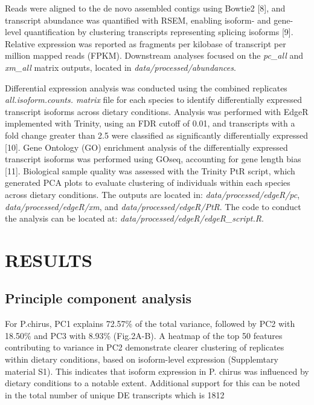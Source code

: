 \documentclass[12pt,]{article}
\begin{document}
Reads were aligned to the de novo assembled contigs using Bowtie2
{[}8{]}, and transcript abundance was quantified with RSEM, enabling
isoform- and gene-level quantification by clustering transcripts
representing splicing isoforms {[}9{]}. Relative expression was reported
as fragments per kilobase of transcript per million mapped reads (FPKM).
Downstream analyses focused on the \emph{pc\_all} and \emph{xm\_all}
matrix outputs, located in \emph{data/processed/abundances}.

Differential expression analysis was conducted using the combined
replicates \emph{all.isoform.counts. matrix} file for each species to
identify differentially expressed transcript isoforms across dietary
conditions. Analysis was performed with EdgeR implemented with Trinity,
using an FDR cutoff of 0.01, and transcripts with a fold change greater
than 2.5 were classified as significantly differentially expressed
{[}10{]}. Gene Ontology (GO) enrichment analysis of the differentially
expressed transcript isoforms was performed using GOseq, accounting for
gene length bias {[}11{]}. Biological sample quality was assessed with
the Trinity PtR script, which generated PCA plots to evaluate clustering
of individuals within each species across dietary conditions. The
outputs are located in: \emph{data/processed/edgeR/pc},
\emph{data/processed/edgeR/xm}, and \emph{data/processed/edgeR/PtR}. The
code to conduct the analysis can be located at:
\emph{data/processed/edgeR/edgeR\_script.R}.

\section{RESULTS}\label{results}

\subsection{Principle component
analysis}\label{principle-component-analysis}

For P.chirus, PC1 explains 72.57\% of the total variance, followed by
PC2 with 18.50\% and PC3 with 8.93\% (Fig.2A-B). A heatmap of the top 50
features contributing to variance in PC2 demonstrate clearer clustering
of replicates within dietary conditions, based on isoform-level
expression (Supplemtary material S1). This indicates that isoform
expression in P. chirus was influenced by dietary conditions to a
notable extent. Additional support for this can be noted in the total
number of unique DE transcripts which is 1812
\end{document}

